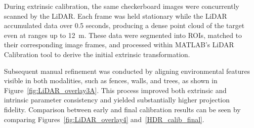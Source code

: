 \documentclass[../main.tex]{subfiles}
\begin{document}

During extrinsic calibration, the same checkerboard images were concurrently scanned by the LiDAR.  
Each frame was held stationary while the LiDAR accumulated data over 0.5 seconds, producing a dense point cloud of the target even at ranges up to 12~m.  
These data were segmented into \acp{ROI}, matched to their corresponding image frames, and processed within MATLAB’s LiDAR Calibration tool \cite{matlab_calibration} to derive the initial extrinsic transformation.


Subsequent manual refinement was conducted by aligning environmental features visible in both modalities, such as fences, walls, and trees, as shown in Figure~\ref{fig:LiDAR_overlay3A}.  
This process improved both extrinsic and intrinsic parameter consistency and yielded substantially higher projection fidelity.  
Comparison between early and final calibration results can be seen by comparing Figures~\ref{fig:LiDAR_overlay4} and~\ref{HDR_calib_final}.

\end{document}
